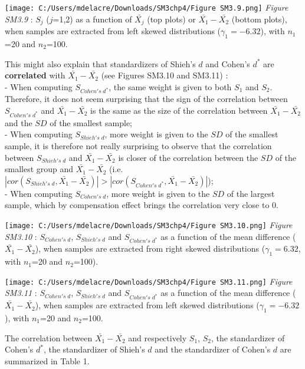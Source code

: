\documentclass[
  english,
  man,mask,floatsintext]{apa6}
\begin{document}
\newpage

\texttt{[image: C:/Users/mdelacre/Downloads/SM3chp4/Figure SM3.9.png]}
\emph{Figure SM3.9} : \(S_j\) (\(j\)=1,2) as a function of \(\bar{X_j}\) (top plots) or \(\bar{X_1}-\bar{X_2}\) (bottom plots), when samples are extracted from left skewed distributions (\(\gamma_1 = -6.32\)), with \(n_1\)=20 and \(n_2\)=100.

\setlength\parindent{24pt}This might also explain that standardizers of Shieh's \(d\) and Cohen's \(d^*\) are \textbf{correlated} with \(\bar{X_1}-\bar{X_2}\) (see Figures SM3.10 and SM3.11) :\\
- When computing \(S_{Cohen's \; d^*}\), the same weight is given to both \(S_1\) and \(S_2\). Therefore, it does not seem surprising that the sign of the correlation between \(S_{Cohen's \; d^*}\) and \(\bar{X_1}-\bar{X_2}\) is the same as the size of the correlation between \(\bar{X_1}-\bar{X_2}\) and the \(SD\) of the smallest sample;\\
- When computing \(S_{Shieh's \; d}\), more weight is given to the \(SD\) of the smallest sample, it is therefore not really surprising to observe that the correlation between \(S_{Shieh's \; d}\) and \(\bar{X_1}-\bar{X_2}\) is closer of the correlation between the \(SD\) of the smallest group and \(\bar{X_1}-\bar{X_2}\) (i.e.~\(|cor(S_{Shieh's \; d},\bar{X_1}-\bar{X_2})| > |cor(S_{Cohen's \; d^*},\bar{X_1}-\bar{X_2})|\));\\
- When computing \(S_{Cohen's \; d}\), more weight is given to the \(SD\) of the largest sample, which by compensation effect brings the correlation very close to 0.

\texttt{[image: C:/Users/mdelacre/Downloads/SM3chp4/Figure SM3.10.png]}
\setlength\parindent{0pt}\emph{Figure SM3.10} : \(S_{Cohen's \; d}\), \(S_{Shieh's \; d}\) and \(S_{Cohen's \; d^*}\) as a function of the mean difference (\(\bar{X_1}-\bar{X_2}\)), when samples are extracted from right skewed distributions (\(\gamma_1 = 6.32\), with \(n_1\)=20 and \(n_2\)=100).

\texttt{[image: C:/Users/mdelacre/Downloads/SM3chp4/Figure SM3.11.png]}
\emph{Figure SM3.11} : \(S_{Cohen's \; d}\), \(S_{Shieh's \; d}\) and \(S_{Cohen's \; d^*}\) as a function of the mean difference (\(\bar{X_1}-\bar{X_2}\)), when samples are extracted from left skewed distributions (\(\gamma_1 = -6.32\)), with \(n_1\)=20 and \(n_2\)=100.

\setlength\parindent{24pt}The correlation between \(\bar{X_1}-\bar{X_2}\) and respectively \(S_1\), \(S_2\), the standardizer of Cohen's \(d^*\), the standardizer of Shieh's \(d\) and the standardizer of Cohen's \(d\) are summarized in Table 1.
\end{document}
